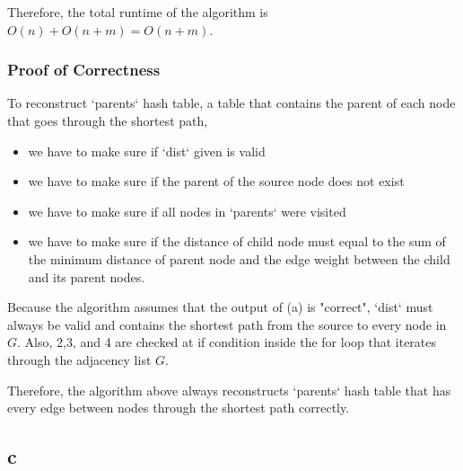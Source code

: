 \documentclass[11pt]{article}
\begin{document}
Therefore, the total runtime of the algorithm is $O(n) + O(n+m) = O(n+m)$.

\subsubsection{Proof of Correctness}
To reconstruct `parents` hash table, a table that contains the parent of each node that goes through the shortest path, 
\begin{itemize}
\item we have to make sure if `dist` given is valid
\item we have to make sure if the parent of the source node does not exist
\item we have to make sure if all nodes in `parents` were visited  
\item we have to make sure if the distance of child node must equal to the sum of the minimum distance of parent node and the edge weight between the child and its parent nodes. 
\end{itemize}

Because the algorithm assumes that the output of (a) is "correct", `dist` must always be valid and contains the shortest path from the source to every node in $G$.
Also, 2,3, and 4 are checked at if condition inside the for loop that iterates through the adjacency list $G$.

Therefore, the algorithm above always reconstructs `parents` hash table that has every edge between nodes through the shortest path correctly.

\subsection{c}
\begin{center}
\end{center}
\end{document}
